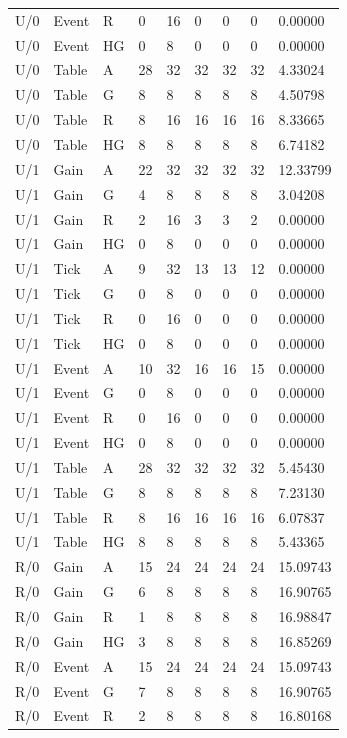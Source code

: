 \begin{longtable}{lllllllll}
U/0 & Event & R & 0 & 16 & 0 & 0 & 0 & 0.00000 \\
U/0 & Event & HG & 0 & 8 & 0 & 0 & 0 & 0.00000 \\
U/0 & Table & A & 28 & 32 & 32 & 32 & 32 & 4.33024 \\
U/0 & Table & G & 8 & 8 & 8 & 8 & 8 & 4.50798 \\
U/0 & Table & R & 8 & 16 & 16 & 16 & 16 & 8.33665 \\
U/0 & Table & HG & 8 & 8 & 8 & 8 & 8 & 6.74182 \\
U/1 & Gain & A & 22 & 32 & 32 & 32 & 32 & 12.33799 \\
U/1 & Gain & G & 4 & 8 & 8 & 8 & 8 & 3.04208 \\
U/1 & Gain & R & 2 & 16 & 3 & 3 & 2 & 0.00000 \\
U/1 & Gain & HG & 0 & 8 & 0 & 0 & 0 & 0.00000 \\
U/1 & Tick & A & 9 & 32 & 13 & 13 & 12 & 0.00000 \\
U/1 & Tick & G & 0 & 8 & 0 & 0 & 0 & 0.00000 \\
U/1 & Tick & R & 0 & 16 & 0 & 0 & 0 & 0.00000 \\
U/1 & Tick & HG & 0 & 8 & 0 & 0 & 0 & 0.00000 \\
U/1 & Event & A & 10 & 32 & 16 & 16 & 15 & 0.00000 \\
U/1 & Event & G & 0 & 8 & 0 & 0 & 0 & 0.00000 \\
U/1 & Event & R & 0 & 16 & 0 & 0 & 0 & 0.00000 \\
U/1 & Event & HG & 0 & 8 & 0 & 0 & 0 & 0.00000 \\
U/1 & Table & A & 28 & 32 & 32 & 32 & 32 & 5.45430 \\
U/1 & Table & G & 8 & 8 & 8 & 8 & 8 & 7.23130 \\
U/1 & Table & R & 8 & 16 & 16 & 16 & 16 & 6.07837 \\
U/1 & Table & HG & 8 & 8 & 8 & 8 & 8 & 5.43365 \\
R/0 & Gain & A & 15 & 24 & 24 & 24 & 24 & 15.09743 \\
R/0 & Gain & G & 6 & 8 & 8 & 8 & 8 & 16.90765 \\
R/0 & Gain & R & 1 & 8 & 8 & 8 & 8 & 16.98847 \\
R/0 & Gain & HG & 3 & 8 & 8 & 8 & 8 & 16.85269 \\
R/0 & Event & A & 15 & 24 & 24 & 24 & 24 & 15.09743 \\
R/0 & Event & G & 7 & 8 & 8 & 8 & 8 & 16.90765 \\
R/0 & Event & R & 2 & 8 & 8 & 8 & 8 & 16.80168 \\

\end{longtable}
